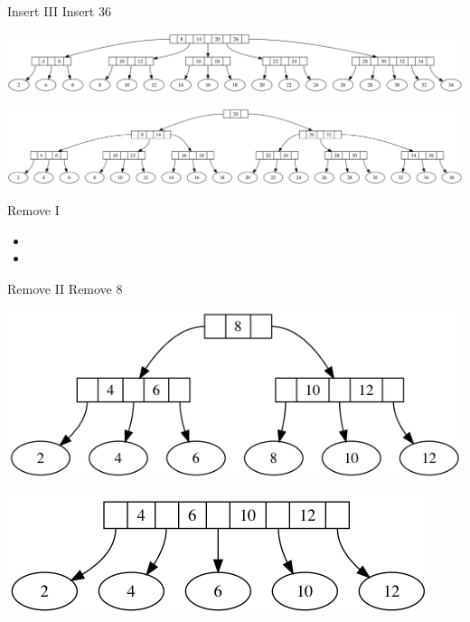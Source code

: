 \documentclass[]{beamer}
\begin{document}
\begin{frame}{Insert III}
Insert 36

\includegraphics[width=\textwidth]{example_16.png}

\vspace{1cm}
\includegraphics[width=\textwidth]{example_17.png}
\end{frame}

\begin{frame}{Remove I}
\begin{itemize}
	\item 
	\item 
\end{itemize}
\end{frame}

\begin{frame}{Remove II}
Remove 8
\begin{center}
\includegraphics[scale=0.4]{example_5.png}

\vspace{1cm}
\includegraphics[scale=0.5]{example_6_rem.png}
\end{center}
\end{frame}
\end{document}
